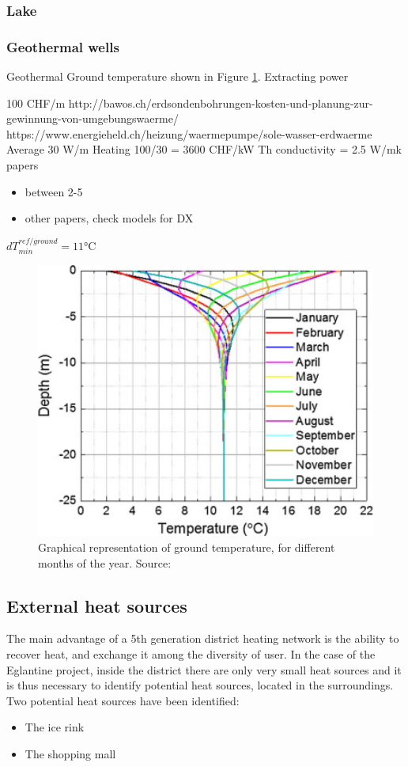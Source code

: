 \documentclass{article}
\begin{document}
\subsubsection{Lake}

\subsubsection{Geothermal wells}
Geothermal
Ground temperature shown in Figure \ref{fig:GTW_temp}.
Extracting power

100 CHF/m
http://bawos.ch/erdsondenbohrungen-kosten-und-planung-zur-gewinnung-von-umgebungswaerme/ 
https://www.energieheld.ch/heizung/waermepumpe/sole-wasser-erdwaerme 
Average 30 W/m
Heating 100/30 = 3600 CHF/kW
Th conductivity = 2.5 W/mk 
papers 
\begin{itemize}
\item between 2-5 \cite{jiaReviewEffectiveThermal2019}
\item other papers, check models for DX
\end{itemize}
$dT_{min}^{ref/ground} = 11 \si{\celsius}$

\begin{figure}[h!]
\centering
\includegraphics[width=1\textwidth]{GTW_temp.jpg}
\caption{Graphical representation of ground temperature, for different months of the year. Source: \cite{hanSensitivityAnalysisVertical2016}}
\label{fig:GTW_temp}
\end{figure}

\subsection{External heat sources}
The main advantage of a 5th generation district heating network is the ability to recover heat, and exchange it among the diversity of user. In the case of the Eglantine project, inside the district there are only very small heat sources and it is thus necessary to identify potential heat sources, located in the surroundings. 
Two potential heat sources have been identified:
\begin{itemize}
    \item The ice rink
    \item The shopping mall
\end{itemize}
\end{document}
